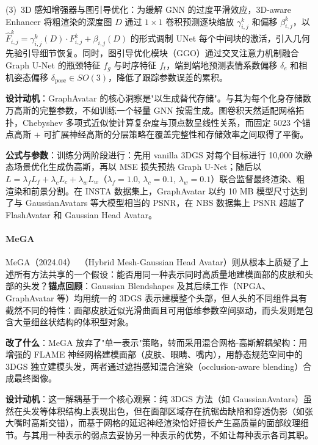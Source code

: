 (3)~3D 感知增强器与图引导优化：为缓解 GNN 的过度平滑效应，3D-aware Enhancer 将粗渲染的深度图 $D$ 通过 $1 \times 1$ 卷积预测逐块缩放 $\gamma_{i,j}^k$ 和偏移 $\beta_{i,j}^k$，以 $\hat{F}_{i,j}^k = \gamma_{i,j}^k(D) \cdot F_{i,j}^k + \beta_{i,j}(D)$ 的形式调制 UNet 每个中间块的激活，引入几何先验引导细节恢复。同时，图引导优化模块（GGO）通过交叉注意力机制融合 Graph U-Net 的瓶颈特征 $f_g$ 与时序特征 $f_t$，端到端地预测表情系数偏移 $\delta_e$ 和相机姿态偏移 $\delta_{\text{pose}} \in SO(3)$，降低了跟踪参数误差的累积。

\textbf{设计动机}：GraphAvatar 的核心洞察是"以生成替代存储"。与其为每个化身存储数万高斯的完整参数，不如训练一个轻量 GNN 按需生成。图卷积天然适配网格拓扑，Chebyshev 多项式近似使计算复杂度与顶点数呈线性关系，而固定 5023 个锚点高斯 + 可扩展神经高斯的分层策略在覆盖完整性和存储效率之间取得了平衡。

\textbf{公式与参数}：训练分两阶段进行：先用 vanilla 3DGS 对每个目标进行 10,000 次静态场景优化生成伪高斯，再以 MSE 损失预热 Graph U-Net；随后以 $L = \lambda_f L_f + \lambda_c L_c + \lambda_w L_w$（$\lambda_f = 1.0$, $\lambda_c = 0.1$, $\lambda_w = 0.1$）联合监督最终渲染、粗渲染和前景分割。在 INSTA 数据集上，GraphAvatar 以约 10 MB 模型尺寸达到了与 GaussianAvatars 等大模型相当的 PSNR，在 NBS 数据集上 PSNR 超越了 FlashAvatar 和 Gaussian Head Avatar。

\paragraph{MeGA}

MeGA（2024.04）~\cite{2404_19026}（Hybrid Mesh-Gaussian Head Avatar）则从根本上质疑了上述所有方法共享的一个假设：能否用同一种表示同时高质量地建模面部的皮肤和头部的头发？\textbf{锚点回顾}：Gaussian Blendshapes 及其后续工作（NPGA、GraphAvatar 等）均用统一的 3DGS 表示建模整个头部，但人头的不同组件具有截然不同的特性：面部皮肤近似光滑曲面且可用低维参数空间驱动，而头发则是包含大量细丝状结构的体积型对象。

\textbf{改了什么}：MeGA 放弃了"单一表示"策略，转而采用混合网格-高斯解耦架构：用增强的 FLAME 神经网格建模面部（皮肤、眼睛、嘴内），用静态规范空间中的 3DGS 独立建模头发，两者通过遮挡感知混合渲染（occlusion-aware blending）合成最终图像。

\textbf{设计动机}：这一解耦基于一个核心观察：纯 3DGS 方法（如 GaussianAvatars）虽然在头发等体积结构上表现出色，但在面部区域存在抗锯齿缺陷和穿透伪影（如张大嘴时高斯交错），而基于网格的延迟神经渲染恰好擅长产生高质量的面部纹理细节。与其用一种表示的弱点去妥协另一种表示的优势，不如让每种表示各司其职。

